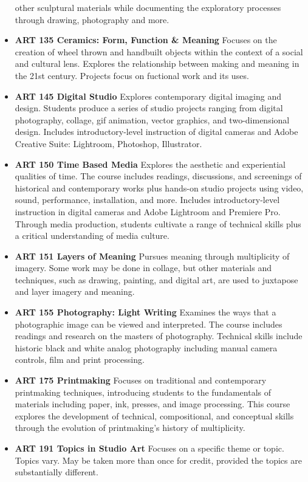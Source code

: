 \documentclass[
  letterpaper,
]{scrbook}
\begin{document}
\begin{itemize}
  other sculptural materials while documenting the exploratory processes
  through drawing, photography and more.
\item
  \textbf{ART 135 Ceramics: Form, Function \& Meaning} Focuses on the
  creation of wheel thrown and handbuilt objects within the context of a
  social and cultural lens. Explores the relationship between making and
  meaning in the 21st century. Projects focus on fuctional work and its
  uses.
\item
  \textbf{ART 145 Digital Studio} Explores contemporary digital imaging
  and design. Students produce a series of studio projects ranging from
  digital photography, collage, gif animation, vector graphics, and
  two-dimensional design. Includes introductory-level instruction of
  digital cameras and Adobe Creative Suite: Lightroom, Photoshop,
  Illustrator.
\item
  \textbf{ART 150 Time Based Media} Explores the aesthetic and
  experiential qualities of time. The course includes readings,
  discussions, and screenings of historical and contemporary works plus
  hands-on studio projects using video, sound, performance,
  installation, and more. Includes introductory-level instruction in
  digital cameras and Adobe Lightroom and Premiere Pro. Through media
  production, students cultivate a range of technical skills plus a
  critical understanding of media culture.
\item
  \textbf{ART 151 Layers of Meaning} Pursues meaning through
  multiplicity of imagery. Some work may be done in collage, but other
  materials and techniques, such as drawing, painting, and digital art,
  are used to juxtapose and layer imagery and meaning.
\item
  \textbf{ART 155 Photography: Light Writing} Examines the ways that a
  photographic image can be viewed and interpreted. The course includes
  readings and research on the masters of photography. Technical skills
  include historic black and white analog photography including manual
  camera controls, film and print processing.
\item
  \textbf{ART 175 Printmaking} Focuses on traditional and contemporary
  printmaking techniques, introducing students to the fundamentals of
  materials including paper, ink, presses, and image processing. This
  course explores the development of technical, compositional, and
  conceptual skills through the evolution of printmaking's history of
  multiplicity.
\item
  \textbf{ART 191 Topics in Studio Art} Focuses on a specific theme or
  topic. Topics vary. May be taken more than once for credit, provided
  the topics are substantially different.
\end{itemize}
\end{document}
